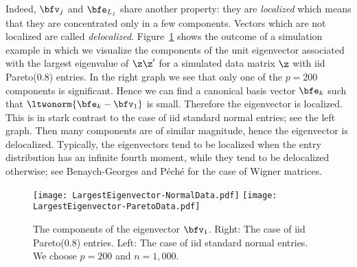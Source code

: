 Indeed, $\bfv_j$ and $\bfe_{L_j}$ share another property: they are {\em localized} which means that they are concentrated only in a few components. Vectors which are not localized are called {\em delocalized}.
Figure~\ref{fig:eigenvectors} shows the outcome of a simulation example in which we visualize 
the components of the unit eigenvector associated with the largest eigenvalue of $\z\z'$ 
for a simulated data matrix $\z$ with iid Pareto(0.8) entries. In the right graph
we see that only one of the $p=200$ components is significant. 
Hence we can find a canonical basis vector $\bfe_{k}$ such that $\ltwonorm{\bfe_{k}-\bfv_{1}}$ is small. 
Therefore the eigenvector is localized. This is in stark contrast to the case of iid standard normal entries; see the left graph.
Then many components are of similar magnitude, hence the eigenvector is delocalized. 
Typically, the eigenvectors tend to be localized when the entry distribution has an infinite fourth moment, 
while they tend to be delocalized  otherwise; see Benaych-Georges and P\'{e}ch\'{e} \cite{benaych:peche} for the case of Wigner matrices. 
\begin{figure}[htb!]
  \centering
  \subfigure%
{
    \texttt{[image: LargestEigenvector-NormalData.pdf]}
  }
{
    \texttt{[image: LargestEigenvector-ParetoData.pdf]}
  }
  \caption{The components of the eigenvector $\bfv_1$. Right: The case of iid Pareto(0.8) entries. Left: The case
of iid standard normal entries. 
We choose $p=200$ and $n=1,000$.
}
  \label{fig:eigenvectors}
\end{figure}




